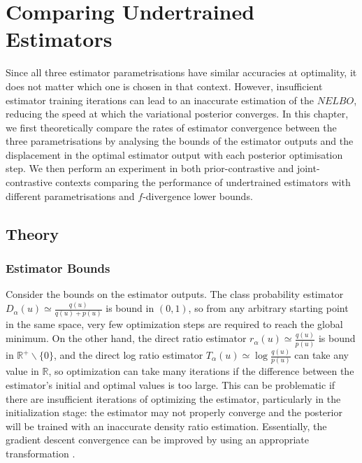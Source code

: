 \documentclass[honours,12pt]{unswthesis}
\newcommand{\R}{\mathbb{R}}
\numberwithin{equation}{section}
\theoremstyle{definition}
\begin{document}
\chapter{Comparing Undertrained Estimators}
Since all three estimator parametrisations have similar accuracies at optimality, it does not matter which one is chosen in that context. However, insufficient estimator training iterations can lead to an inaccurate estimation of the $NELBO$, reducing the speed at which the variational posterior converges. In this chapter, we first theoretically compare the rates of estimator convergence between the three parametrisations by analysing the bounds of the estimator outputs and the displacement in the optimal estimator output with each posterior optimisation step. We then perform an experiment in both prior-contrastive and joint-contrastive contexts comparing the performance of undertrained estimators with different parametrisations and $f$-divergence lower bounds.
\section{Theory}
\subsection{Estimator Bounds}
Consider the bounds on the estimator outputs. The class probability estimator $D_\alpha(u)\simeq \frac{q(u)}{q(u)+p(u)}$ is bound in $(0,1)$, so from any arbitrary starting point in the same space, very few optimization steps are required to reach the global minimum. On the other hand, the direct ratio estimator $r_\alpha(u)\simeq \frac{q(u)}{p(u)}$ is bound in $\R^+ \backslash \{0\}$, and the direct log ratio estimator $T_\alpha(u) \simeq \log \frac{q(u)}{p(u)}$ can take any value in $\R$, so optimization can take many iterations if the difference between the estimator's initial and optimal values is too large. This can be problematic if there are insufficient iterations of optimizing the estimator, particularly in the initialization stage: the estimator may not properly converge and the posterior will be trained with an inaccurate density ratio estimation. Essentially, the gradient descent convergence can be improved by using an appropriate transformation \citep{lecun}.
\end{document}
